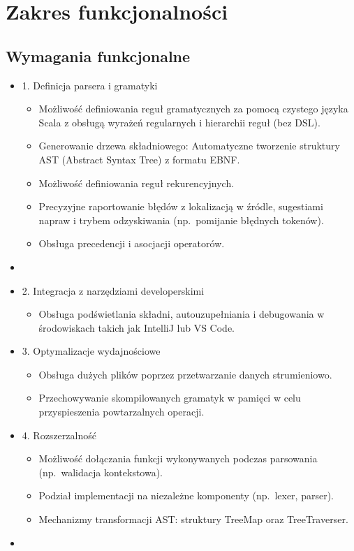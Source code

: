 \chapter{Zakres funkcjonalności}
\label{ch:zakres-funkcjonalnosci}


\section{Wymagania funkcjonalne}
\label{sec:wymagania-funkcjonalne}

\begin{itemize}

    \item 1. Definicja parsera i gramatyki
    \begin{itemize}
        \item Możliwość definiowania reguł gramatycznych za pomocą czystego języka Scala z obsługą wyrażeń regularnych i hierarchii reguł (bez DSL).
        \item Generowanie drzewa składniowego: Automatyczne tworzenie struktury AST (Abstract Syntax Tree) z formatu EBNF\@.
        \item Możliwość definiowania reguł rekurencyjnych.
        \item Precyzyjne raportowanie błędów z lokalizacją w źródle, sugestiami napraw i trybem odzyskiwania (np.\ pomijanie błędnych tokenów).
        \item Obsługa precedencji i asocjacji operatorów.
    \end{itemize}

    \item \item 2. Integracja z narzędziami developerskimi
    \begin{itemize}
        \item Obsługa podświetlania składni, autouzupełniania i debugowania w środowiskach takich jak IntelliJ lub VS Code.
    \end{itemize}

    \item 3. Optymalizacje wydajnościowe
    \begin{itemize}
        \item Obsługa dużych plików poprzez przetwarzanie danych strumieniowo.
        \item Przechowywanie skompilowanych gramatyk w pamięci w celu przyspieszenia powtarzalnych operacji.
    \end{itemize}

    \item 4. Rozszerzalność
    \begin{itemize}
        \item Możliwość dołączania funkcji wykonywanych podczas parsowania (np.\ walidacja kontekstowa).
        \item Podział implementacji na niezależne komponenty (np.\ lexer, parser).
        \item Mechanizmy transformacji AST: struktury TreeMap oraz TreeTraverser.
    \end{itemize}

    \item
\end{itemize}


